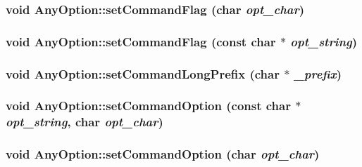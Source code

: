 \label{classAnyOption_ad7720617bda6fb5519d195989c8605f2}
\hypertarget{classAnyOption_a226781e167bfa77a3c57e7207a0406b9}{
\subsubsection[{setCommandFlag}]{\setlength{\rightskip}{0pt plus 5cm}void AnyOption::setCommandFlag (char {\em opt\_\-char})}}
\label{classAnyOption_a226781e167bfa77a3c57e7207a0406b9}
\hypertarget{classAnyOption_ab84fbc729395adf0f0989c578a388934}{
\subsubsection[{setCommandFlag}]{\setlength{\rightskip}{0pt plus 5cm}void AnyOption::setCommandFlag (const char $\ast$ {\em opt\_\-string})}}
\label{classAnyOption_ab84fbc729395adf0f0989c578a388934}
\hypertarget{classAnyOption_ac0cd7c2ee11e27fc1a8f8097d8bb21fa}{
\subsubsection[{setCommandLongPrefix}]{\setlength{\rightskip}{0pt plus 5cm}void AnyOption::setCommandLongPrefix (char $\ast$ {\em \_\-prefix})}}
\label{classAnyOption_ac0cd7c2ee11e27fc1a8f8097d8bb21fa}
\hypertarget{classAnyOption_a232adbe285778b7b1745ebb419bfbced}{
\subsubsection[{setCommandOption}]{\setlength{\rightskip}{0pt plus 5cm}void AnyOption::setCommandOption (const char $\ast$ {\em opt\_\-string}, \/  char {\em opt\_\-char})}}
\label{classAnyOption_a232adbe285778b7b1745ebb419bfbced}
\hypertarget{classAnyOption_a639b708b4c3953e7017f224b9b8082b3}{
\subsubsection[{setCommandOption}]{\setlength{\rightskip}{0pt plus 5cm}void AnyOption::setCommandOption (char {\em opt\_\-char})}}
